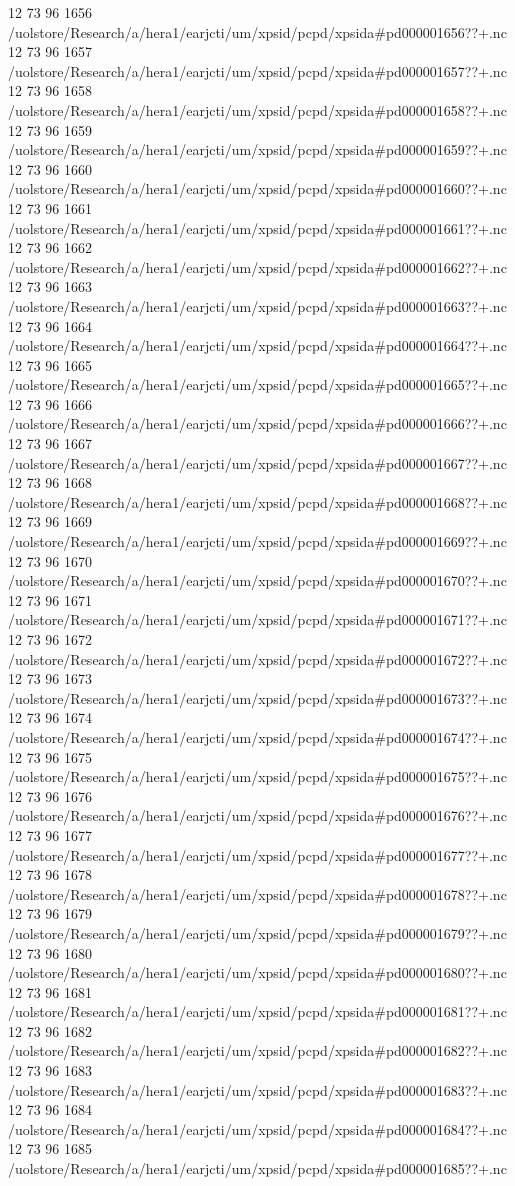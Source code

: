 12 73 96
1656
/uolstore/Research/a/hera1/earjcti/um/xpsid/pcpd/xpsida#pd000001656??+.nc
12 73 96
1657
/uolstore/Research/a/hera1/earjcti/um/xpsid/pcpd/xpsida#pd000001657??+.nc
12 73 96
1658
/uolstore/Research/a/hera1/earjcti/um/xpsid/pcpd/xpsida#pd000001658??+.nc
12 73 96
1659
/uolstore/Research/a/hera1/earjcti/um/xpsid/pcpd/xpsida#pd000001659??+.nc
12 73 96
1660
/uolstore/Research/a/hera1/earjcti/um/xpsid/pcpd/xpsida#pd000001660??+.nc
12 73 96
1661
/uolstore/Research/a/hera1/earjcti/um/xpsid/pcpd/xpsida#pd000001661??+.nc
12 73 96
1662
/uolstore/Research/a/hera1/earjcti/um/xpsid/pcpd/xpsida#pd000001662??+.nc
12 73 96
1663
/uolstore/Research/a/hera1/earjcti/um/xpsid/pcpd/xpsida#pd000001663??+.nc
12 73 96
1664
/uolstore/Research/a/hera1/earjcti/um/xpsid/pcpd/xpsida#pd000001664??+.nc
12 73 96
1665
/uolstore/Research/a/hera1/earjcti/um/xpsid/pcpd/xpsida#pd000001665??+.nc
12 73 96
1666
/uolstore/Research/a/hera1/earjcti/um/xpsid/pcpd/xpsida#pd000001666??+.nc
12 73 96
1667
/uolstore/Research/a/hera1/earjcti/um/xpsid/pcpd/xpsida#pd000001667??+.nc
12 73 96
1668
/uolstore/Research/a/hera1/earjcti/um/xpsid/pcpd/xpsida#pd000001668??+.nc
12 73 96
1669
/uolstore/Research/a/hera1/earjcti/um/xpsid/pcpd/xpsida#pd000001669??+.nc
12 73 96
1670
/uolstore/Research/a/hera1/earjcti/um/xpsid/pcpd/xpsida#pd000001670??+.nc
12 73 96
1671
/uolstore/Research/a/hera1/earjcti/um/xpsid/pcpd/xpsida#pd000001671??+.nc
12 73 96
1672
/uolstore/Research/a/hera1/earjcti/um/xpsid/pcpd/xpsida#pd000001672??+.nc
12 73 96
1673
/uolstore/Research/a/hera1/earjcti/um/xpsid/pcpd/xpsida#pd000001673??+.nc
12 73 96
1674
/uolstore/Research/a/hera1/earjcti/um/xpsid/pcpd/xpsida#pd000001674??+.nc
12 73 96
1675
/uolstore/Research/a/hera1/earjcti/um/xpsid/pcpd/xpsida#pd000001675??+.nc
12 73 96
1676
/uolstore/Research/a/hera1/earjcti/um/xpsid/pcpd/xpsida#pd000001676??+.nc
12 73 96
1677
/uolstore/Research/a/hera1/earjcti/um/xpsid/pcpd/xpsida#pd000001677??+.nc
12 73 96
1678
/uolstore/Research/a/hera1/earjcti/um/xpsid/pcpd/xpsida#pd000001678??+.nc
12 73 96
1679
/uolstore/Research/a/hera1/earjcti/um/xpsid/pcpd/xpsida#pd000001679??+.nc
12 73 96
1680
/uolstore/Research/a/hera1/earjcti/um/xpsid/pcpd/xpsida#pd000001680??+.nc
12 73 96
1681
/uolstore/Research/a/hera1/earjcti/um/xpsid/pcpd/xpsida#pd000001681??+.nc
12 73 96
1682
/uolstore/Research/a/hera1/earjcti/um/xpsid/pcpd/xpsida#pd000001682??+.nc
12 73 96
1683
/uolstore/Research/a/hera1/earjcti/um/xpsid/pcpd/xpsida#pd000001683??+.nc
12 73 96
1684
/uolstore/Research/a/hera1/earjcti/um/xpsid/pcpd/xpsida#pd000001684??+.nc
12 73 96
1685
/uolstore/Research/a/hera1/earjcti/um/xpsid/pcpd/xpsida#pd000001685??+.nc
